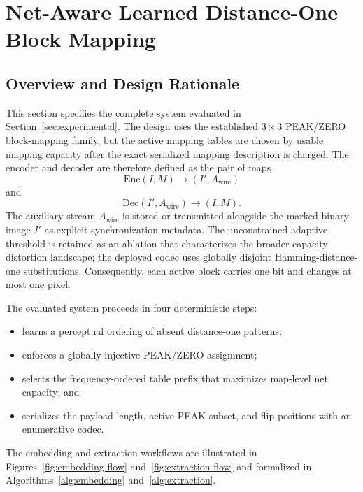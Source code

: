 \documentclass[a4paper,fleqn]{cas-dc}
\newcommand{\RevisionAddBegin}{\begingroup\color{revisionblue}}
\newcommand{\RevisionAddEnd}{\endgroup}
\begin{document}
\section{Net-Aware Learned Distance-One Block Mapping}
\label{sec:proposedmethod}

\subsection{Overview and Design Rationale}

This section specifies the complete system evaluated in
Section~\ref{sec:experimental}. The design uses the established
$3\times3$ PEAK/ZERO block-mapping family, but the active mapping tables are
chosen by usable mapping capacity after the exact serialized mapping description is
charged. The encoder and decoder are therefore defined as the pair of maps
\begin{equation}
\mathrm{Enc}(I,M)\rightarrow(I',A_{\mathrm{wire}})
\label{eq:encoder-contract}
\end{equation}
and
\begin{equation}
\mathrm{Dec}(I',A_{\mathrm{wire}})\rightarrow(I,M).
\label{eq:decoder-contract}
\end{equation}
The auxiliary stream $A_{\mathrm{wire}}$ is stored or transmitted alongside the
marked binary image $I'$ as explicit synchronization metadata. The
unconstrained adaptive threshold is retained as an ablation that characterizes
the broader capacity--distortion landscape; the deployed codec uses globally
disjoint Hamming-distance-one substitutions. Consequently, each active block
carries one bit and changes at most one pixel.

\RevisionAddBegin
The evaluated system proceeds in four deterministic steps:
\RevisionAddEnd
\begin{itemize}
    \item learns a perceptual ordering of absent distance-one patterns;
    \item enforces a globally injective PEAK/ZERO assignment;
\RevisionAddBegin
    \item selects the frequency-ordered table prefix that maximizes map-level
    net capacity; and
\RevisionAddEnd
    \item serializes the payload length, active PEAK subset, and flip positions
    with an enumerative codec.
\end{itemize}

The embedding and extraction workflows are illustrated in
Figures~\ref{fig:embedding-flow} and~\ref{fig:extraction-flow} and formalized
in Algorithms~\ref{alg:embedding} and~\ref{alg:extraction}.
\end{document}
